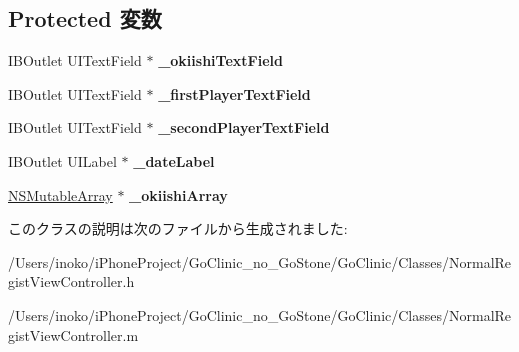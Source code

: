 \subsection*{Protected 変数}
\begin{DoxyCompactItemize}
\item 
\hypertarget{interface_normal_regist_view_controller_a1a88180881e1ccf00bb39768b7fc70a0}{
IBOutlet UITextField $\ast$ {\bfseries \_\-okiishiTextField}}
\label{interface_normal_regist_view_controller_a1a88180881e1ccf00bb39768b7fc70a0}

\item 
\hypertarget{interface_normal_regist_view_controller_a99eef76a4bc0d365393d98e2c7d54865}{
IBOutlet UITextField $\ast$ {\bfseries \_\-firstPlayerTextField}}
\label{interface_normal_regist_view_controller_a99eef76a4bc0d365393d98e2c7d54865}

\item 
\hypertarget{interface_normal_regist_view_controller_a6b96e064c9119e0e435137e93cc9d04f}{
IBOutlet UITextField $\ast$ {\bfseries \_\-secondPlayerTextField}}
\label{interface_normal_regist_view_controller_a6b96e064c9119e0e435137e93cc9d04f}

\item 
\hypertarget{interface_normal_regist_view_controller_a392d6c262866f7216d1b571155e84c9a}{
IBOutlet UILabel $\ast$ {\bfseries \_\-dateLabel}}
\label{interface_normal_regist_view_controller_a392d6c262866f7216d1b571155e84c9a}

\item 
\hypertarget{interface_normal_regist_view_controller_a7e7e1fec1ba71d4323ab09754d52e0a6}{
\hyperlink{class_n_s_mutable_array}{NSMutableArray} $\ast$ {\bfseries \_\-okiishiArray}}
\label{interface_normal_regist_view_controller_a7e7e1fec1ba71d4323ab09754d52e0a6}

\end{DoxyCompactItemize}


このクラスの説明は次のファイルから生成されました:\begin{DoxyCompactItemize}
\item 
/Users/inoko/iPhoneProject/GoClinic\_\-no\_\-GoStone/GoClinic/Classes/NormalRegistViewController.h\item 
/Users/inoko/iPhoneProject/GoClinic\_\-no\_\-GoStone/GoClinic/Classes/NormalRegistViewController.m\end{DoxyCompactItemize}
